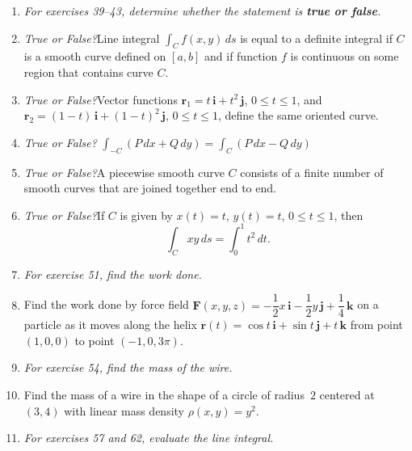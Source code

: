 \documentclass[12pt, twoside]{article}
\begin{document}
\begin{enumerate}[leftmargin=*, itemsep=1.5em]

\item[]\textit{For exercises 39--43, determine whether the statement is \textbf{true or false}.}

\item[\textbf{39.}]
\textit{True or False?}\enspace Line integral $\displaystyle\int_C f(x,y)\,ds$ is equal to a
definite integral if $C$ is a smooth curve defined on $[a,b]$ and if function $f$ is
continuous on some region that contains curve $C$.

\item[\textbf{40.}]
\textit{True or False?}\enspace Vector functions $\mathbf{r}_1 = t\,\mathbf{i} + t^2\,\mathbf{j}$,
$0\le t\le 1$, and $\mathbf{r}_2 = (1-t)\,\mathbf{i} + (1-t)^2\,\mathbf{j}$, $0\le t\le 1$,
define the same oriented curve.

\item[\textbf{41.}]
\textit{True or False?}\enspace
$\displaystyle\int_{-C}(P\,dx+Q\,dy) = \int_C(P\,dx-Q\,dy)$

\item[\textbf{42.}]
\textit{True or False?}\enspace A piecewise smooth curve $C$ consists of a finite number of
smooth curves that are joined together end to end.

\item[\textbf{43.}]
\textit{True or False?}\enspace If $C$ is given by $x(t)=t$, $y(t)=t$, $0\le t\le 1$, then
\[
  \int_C xy\,ds = \int_0^1 t^2\,dt.
\]

\item[]\textit{For exercise 51, find the work done.}

\item[\textbf{51.}]
Find the work done by force field
$\mathbf{F}(x,y,z) = -\dfrac{1}{2}x\,\mathbf{i} - \dfrac{1}{2}y\,\mathbf{j} + \dfrac{1}{4}\,\mathbf{k}$
on a particle as it moves along the helix
$\mathbf{r}(t) = \cos t\,\mathbf{i} + \sin t\,\mathbf{j} + t\,\mathbf{k}$
from point $(1,0,0)$ to point $(-1,0,3\pi)$.

\item[]\textit{For exercise 54, find the mass of the wire.}

\item[\textbf{54.}]
Find the mass of a wire in the shape of a circle of radius~$2$ centered at $(3,4)$
with linear mass density $\rho(x,y)=y^2$.

\item[]\textit{For exercises 57 and 62, evaluate the line integral.}


\end{enumerate}
\end{document}
